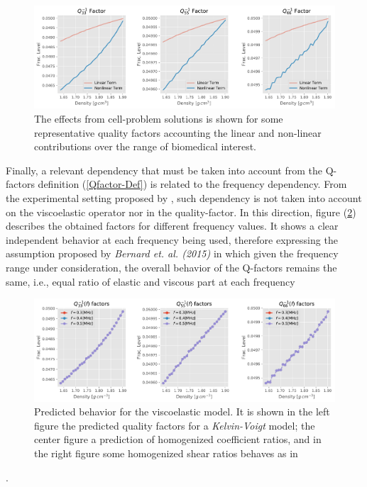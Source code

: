\begin{figure}[!h]
	\centering
	\includegraphics[width=\textwidth]{images/Qfactors/PlotsVisc_Circular2DPart50EPS5-2_Ome5.pdf}
	\caption{The effects from cell-problem solutions is shown for some representative quality factors accounting the linear and non-linear contributions over the range of biomedical interest.}
	\label{QfactorDecomposition}
\end{figure} 

Finally, a relevant dependency that must be taken into account from the Q-factors definition (\ref{Qfactor-Def}) is related to the frequency dependency. From the experimental setting proposed by \cite{Bernard2015}, such dependency is not taken into account on the viscoelastic operator nor in the quality-factor. 
In this direction, figure (\ref{BernardPrediction-Freq}) describes the obtained factors for different frequency values. It shows a clear independent behavior at each frequency being used, therefore expressing the assumption proposed by \textit{Bernard et. al. (2015)} \cite{Bernard2015} in which given the frequency range under consideration, the overall behavior of the Q-factors remains the same, i.e., equal ratio of elastic and viscous part at each frequency
\begin{figure}[!h]
	\centering
	\includegraphics[width=\textwidth]{images/Qfactors/QfactorsFreqsEPS5-2.pdf}
	\caption{Predicted behavior for the viscoelastic model. It is shown in the left figure the predicted quality factors for a \textit{Kelvin-Voigt} model; the center figure a prediction of homogenized coefficient ratios, and in the right figure some homogenized shear ratios behaves as in \cite{Bernard2015} }
	\label{BernardPrediction-Freq}
\end{figure}.






